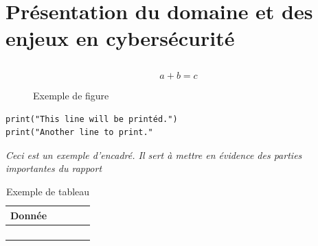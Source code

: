 \chapter{Présentation du domaine et des enjeux en cybersécurité}
    \section{}
        \subsection{}
            \subsubsection{}
                \begin{equation}\label{eq:Eq1}
                    a+b = c
                \end{equation}
                \begin{figure}[H]
                    \centering
                    {}
                    \caption{Exemple de figure}
                \end{figure}
                \begin{lstlisting}[caption={Un code Python}]
print("This line will be printéd.")
print("Another line to print."\end{lstlisting}
                \begin{tcolorbox}[colback=linkborder_Color!5!white,colframe=linkborder_Color!75!black]
                    \textit{Ceci est un exemple d'encadré. Il sert à mettre en évidence des parties importantes du rapport}
                \end{tcolorbox}
                \begin{table}[H]
                    \centering
                    \begin{tabular}{lcccc}
                        \toprule
                        \textbf{Donnée} & \textbf{} & \textbf{} & \textbf{} & \textbf{} \\
                        \midrule
                         &  &  &  &  \\
                         &  &  &  &  \\
                         &  &  &  &  \\
                         &  &  &  &  \\
                        \bottomrule
                    \end{tabular}
                    \caption{Exemple de tableau}
                \end{table}
